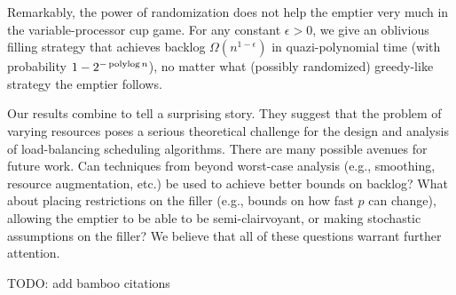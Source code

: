 Remarkably, the power of randomization does not help the emptier
very much in the variable-processor cup game. For any constant
$\epsilon > 0$, we give an oblivious filling strategy that
achieves backlog $\Omega(n^{1 - \epsilon})$ in quazi-polynomial
time (with probability $1 - 2^{-\operatorname{\text{polylog}} n}$), no matter what
(possibly randomized) greedy-like strategy the emptier follows. 

Our results combine to tell a surprising story. They suggest that
the problem of varying resources poses a serious theoretical
challenge for the design and analysis of load-balancing
scheduling algorithms. There are many possible avenues for future
work. Can techniques from beyond worst-case analysis (e.g.,
smoothing, resource augmentation, etc.) be used to achieve better
bounds on backlog? What about placing restrictions on the filler
(e.g., bounds on how fast $p$ can change), allowing the emptier
to be able to be semi-clairvoyant, or making stochastic
assumptions on the filler? We believe that all of these questions
warrant further attention.

{\color{blue}
  TODO: add bamboo citations}






